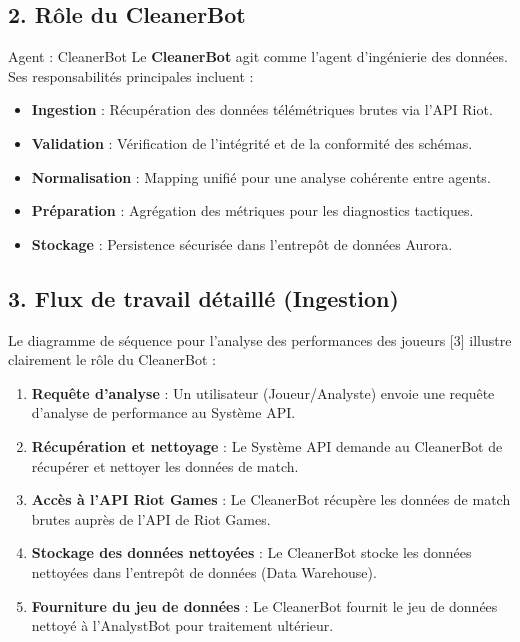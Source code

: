 \documentclass[11pt,a4paper]{article}
\begin{document}
\subsection{2. Rôle du CleanerBot}

\begin{AgentBox}{Agent : CleanerBot}
Le \textbf{CleanerBot} agit comme l'agent d'ingénierie des données. Ses responsabilités principales incluent :\\
\begin{itemize}[label=\color{valorantRed}\faCheckCircle, leftmargin=1cm, itemsep=6pt]
    \item \textbf{Ingestion} : Récupération des données télémétriques brutes via l'API Riot.
    \item \textbf{Validation} : Vérification de l'intégrité et de la conformité des schémas.
    \item \textbf{Normalisation} : Mapping unifié pour une analyse cohérente entre agents.
    \item \textbf{Préparation} : Agrégation des métriques pour les diagnostics tactiques.
    \item \textbf{Stockage} : Persistence sécurisée dans l'entrepôt de données Aurora.
\end{itemize}
\end{AgentBox}

\subsection{3. Flux de travail détaillé (Ingestion)}

Le diagramme de séquence pour l'analyse des performances des joueurs [3] illustre clairement le rôle du CleanerBot :

\begin{enumerate}[label=\protect\tcbox[on line, boxsep=0pt, left=3pt, right=3pt, top=2pt, bottom=2pt, colback=darkNavy, colframe=darkNavy, fontupper=\bfseries\color{white}]{step \arabic*}, leftmargin=2cm]
    \item \textbf{Requête d'analyse} : Un utilisateur (Joueur/Analyste) envoie une requête d'analyse de performance au Système API.
    \item \textbf{Récupération et nettoyage} : Le Système API demande au CleanerBot de récupérer et nettoyer les données de match.
    \item \textbf{Accès à l'API Riot Games} : Le CleanerBot récupère les données de match brutes auprès de l'API de Riot Games.
    \item \textbf{Stockage des données nettoyées} : Le CleanerBot stocke les données nettoyées dans l'entrepôt de données (Data Warehouse).
    \item \textbf{Fourniture du jeu de données} : Le CleanerBot fournit le jeu de données nettoyé à l'AnalystBot pour traitement ultérieur.
\end{enumerate}
\end{document}
